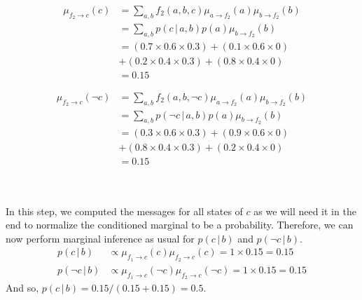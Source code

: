 \documentclass{article}
\newcommand{\giv}{\,|\,}
\begin{document}
\noindent\begin{minipage}{.5\linewidth}
     \begin{equation*}
        \boxed{
        \begin{aligned}
            \mu_{f_2 \rightarrow c}(c) &= \sum_{a, b} f_2(a, b, c) \mu_{a \rightarrow f_2}(a) \mu_{b \rightarrow f_2}(b)\\
            &= \sum_{a, b} p(c \giv a, b) p(a) \mu_{b \rightarrow f_2}(b)\\
            &= (0.7 \times 0.6 \times 0.3) + (0.1 \times 0.6 \times 0) \\
            &+ (0.2 \times 0.4 \times 0.3) + (0.8 \times 0.4 \times 0)\\ 
            &= 0.15
        \end{aligned}
        }
    \end{equation*}
\end{minipage} \hspace{2mm}
\begin{minipage}{.5\linewidth}
    \begin{equation*}
        \boxed{
        \begin{aligned}
           \mu_{f_2 \rightarrow c}(\neg c) &= \sum_{a, b} f_2(a, b, \neg c) \mu_{a \rightarrow f_2}(a) \mu_{b \rightarrow f_2}(b)\\
            &= \sum_{a, b} p(\neg c \giv a, b) p(a) \mu_{b \rightarrow f_2}(b)\\
            &= (0.3 \times 0.6 \times 0.3) + (0.9 \times 0.6 \times 0) \\
            &+ (0.8 \times 0.4 \times 0.3) + (0.2 \times 0.4 \times 0)\\ 
            &= 0.15
        \end{aligned}
        }
    \end{equation*}
\end{minipage}
\\\\
\noindent In this step, we computed the messages for all states of $c$ as we will need it in the end to normalize the conditioned marginal to be a probability. Therefore, we can now perform marginal inference as usual for $p(c \giv b)$ and $p(\neg c \giv b)$.
\begin{align*}
    p(c \giv b) &\propto \mu_{f_1 \rightarrow c}(c) \mu_{f_2 \rightarrow c}(c) = 1 \times 0.15 = 0.15\\
    p(\neg c \giv b) &\propto \mu_{f_1 \rightarrow c}(\neg c) \mu_{f_2 \rightarrow c}(\neg c) = 1 \times 0.15 = 0.15
\end{align*}
\noindent And so, $p(c \giv b) = 0.15/(0.15+0.15) = 0.5$. 
\end{document}
